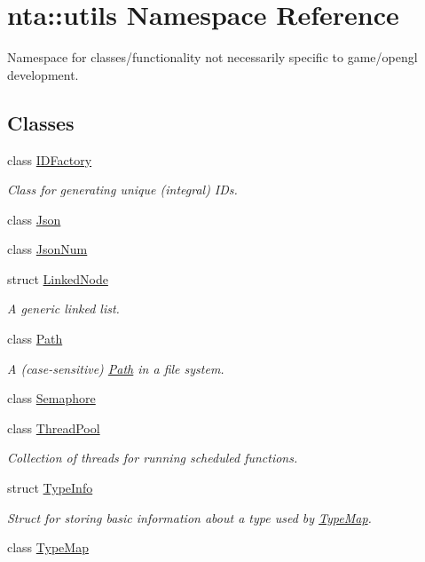 \hypertarget{namespacenta_1_1utils}{}\section{nta\+:\+:utils Namespace Reference}
\label{namespacenta_1_1utils}


Namespace for classes/functionality not necessarily specific to game/opengl development.  


\subsection*{Classes}
\begin{DoxyCompactItemize}
\item 
class \hyperlink{classnta_1_1utils_1_1IDFactory}{I\+D\+Factory}
\begin{DoxyCompactList}\small\item\em Class for generating unique (integral) I\+Ds. \end{DoxyCompactList}\item 
class \hyperlink{classnta_1_1utils_1_1Json}{Json}
\item 
class \hyperlink{classnta_1_1utils_1_1JsonNum}{Json\+Num}
\item 
struct \hyperlink{structnta_1_1utils_1_1LinkedNode}{Linked\+Node}
\begin{DoxyCompactList}\small\item\em A generic linked list. \end{DoxyCompactList}\item 
class \hyperlink{classnta_1_1utils_1_1Path}{Path}
\begin{DoxyCompactList}\small\item\em A (case-\/sensitive) \hyperlink{classnta_1_1utils_1_1Path}{Path} in a file system. \end{DoxyCompactList}\item 
class \hyperlink{classnta_1_1utils_1_1Semaphore}{Semaphore}
\item 
class \hyperlink{classnta_1_1utils_1_1ThreadPool}{Thread\+Pool}
\begin{DoxyCompactList}\small\item\em Collection of threads for running scheduled functions. \end{DoxyCompactList}\item 
struct \hyperlink{structnta_1_1utils_1_1TypeInfo}{Type\+Info}
\begin{DoxyCompactList}\small\item\em Struct for storing basic information about a type used by \hyperlink{classnta_1_1utils_1_1TypeMap}{Type\+Map}. \end{DoxyCompactList}\item 
class \hyperlink{classnta_1_1utils_1_1TypeMap}{Type\+Map}
\end{DoxyCompactItemize}
